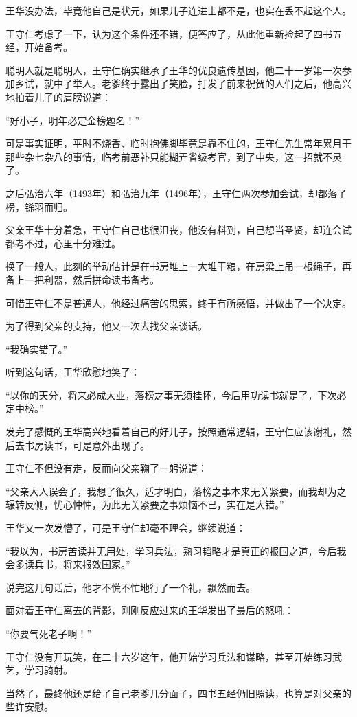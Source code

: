 \begin{multicols}{\theparacolNo}
王华没办法，毕竟他自己是状元，如果儿子连进士都不是，也实在丢不起这个人。

王守仁考虑了一下，认为这个条件还不错，便答应了，从此他重新捡起了四书五经，开始备考。

聪明人就是聪明人，王守仁确实继承了王华的优良遗传基因，他二十一岁第一次参加乡试，就中了举人。老爹终于露出了笑脸，打发了前来祝贺的人们之后，他高兴地拍着儿子的肩膀说道：

“好小子，明年必定金榜题名！”

可是事实证明，平时不烧香、临时抱佛脚毕竟是靠不住的，王守仁先生常年累月干那些杂七杂八的事情，临考前恶补只能糊弄省级考官，到了中央，这一招就不灵了。

之后弘治六年（1493年）和弘治九年（1496年），王守仁两次参加会试，却都落了榜，铩羽而归。

父亲王华十分着急，王守仁自己也很沮丧，他没有料到，自己想当圣贤，却连会试都考不过，心里十分难过。

换了一般人，此刻的举动估计是在书房堆上一大堆干粮，在房梁上吊一根绳子，再备上一把利器，然后拼命读书备考。

可惜王守仁不是普通人，他经过痛苦的思索，终于有所感悟，并做出了一个决定。

为了得到父亲的支持，他又一次去找父亲谈话。

“我确实错了。”

听到这句话，王华欣慰地笑了：

“以你的天分，将来必成大业，落榜之事无须挂怀，今后用功读书就是了，下次必定中榜。”

发完了感慨的王华高兴地看着自己的好儿子，按照通常逻辑，王守仁应该谢礼，然后去书房读书，可是意外出现了。

王守仁不但没有走，反而向父亲鞠了一躬说道：

“父亲大人误会了，我想了很久，适才明白，落榜之事本来无关紧要，而我却为之辗转反侧，忧心忡忡，为此无关紧要之事烦恼不已，实在是大错。”

王华又一次发懵了，可是王守仁却毫不理会，继续说道：

“我以为，书房苦读并无用处，学习兵法，熟习韬略才是真正的报国之道，今后我会多读兵书，将来报效国家。”

说完这几句话后，他才不慌不忙地行了一个礼，飘然而去。

面对着王守仁离去的背影，刚刚反应过来的王华发出了最后的怒吼：

“你要气死老子啊！”

王守仁没有开玩笑，在二十六岁这年，他开始学习兵法和谋略，甚至开始练习武艺，学习骑射。

当然了，最终他还是给了自己老爹几分面子，四书五经仍旧照读，也算是对父亲的些许安慰。


\end{multicols}
